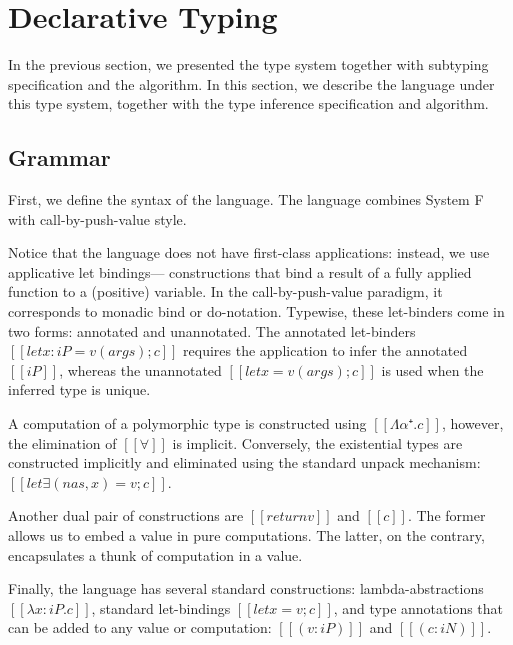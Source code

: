 \documentclass[acmsmall,natbib=false,review,anonymous]{acmart}
\begin{document}
\newpage

\section{Declarative Typing}

In the previous section, we presented the 
type system together with subtyping specification 
and the algorithm. In this section, 
we describe the language under this type system, 
together with the type inference specification
and algorithm.  

\subsection{Grammar}

First, we define the syntax of the language.
The language combines System F with call-by-push-value 
style. 
\begin{definition}
  \hfill
  \begin{multicols}{2}
    \ottgrammartabular{
      \ottc\ottinterrule
    }

    \ottgrammartabular{
      \ottv\ottinterrule
    }
  \end{multicols}
\end{definition}
Notice that the language does not have
first-class applications: instead, 
we use applicative let bindings---
constructions that bind a result of
a fully applied function to a (positive) 
variable.
In the call-by-push-value paradigm, 
it corresponds to monadic bind or do-notation. 
Typewise, these let-binders come in two forms:
annotated and unannotated. The annotated let-binders
$[[let x:iP = v(args); c]]$ 
requires the application to infer the annotated
$[[iP]]$, whereas the unannotated 
$[[let x = v(args); c]]$ 
is used when the inferred type is unique. 

A computation of a polymorphic type is constructed 
using $[[Λα⁺ . c]]$, however, the elimination of $[[∀]]$
is implicit. Conversely, the existential types
are constructed implicitly and eliminated 
using the standard unpack mechanism:
$[[let∃ (nas, x) = v; c]]$.

Another dual pair of constructions are 
$[[return v]]$ and $[[{c}]]$. 
The former allows us to embed a value in pure 
computations. The latter, on the contrary,
encapsulates a thunk of computation in a value. 

Finally, the language has several standard constructions:
lambda-abstractions $[[λx:iP.c]]$,
standard let-bindings $[[let x = v; c]]$,
and type annotations that can be added to any value or computation:
$[[(v:iP)]]$ and $[[(c:iN)]]$.
\end{document}

